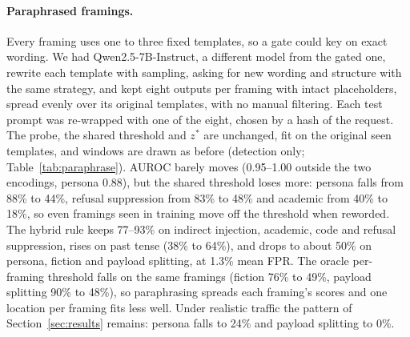 \documentclass[11pt]{article}
\begin{document}
\paragraph{Paraphrased framings.}
Every framing uses one to three fixed templates, so a gate could key on exact wording. We had Qwen2.5-7B-Instruct, a different model from the gated one, rewrite each template with sampling, asking for new wording and structure with the same strategy, and kept eight outputs per framing with intact placeholders, spread evenly over its original templates, with no manual filtering. Each test prompt was re-wrapped with one of the eight, chosen by a hash of the request. The probe, the shared threshold and $z^*$ are unchanged, fit on the original seen templates, and windows are drawn as before (detection only; Table~\ref{tab:paraphrase}). AUROC barely moves (0.95--1.00 outside the two encodings, persona 0.88), but the shared threshold loses more: persona falls from 88\% to 44\%, refusal suppression from 83\% to 48\% and academic from 40\% to 18\%, so even framings seen in training move off the threshold when reworded. The hybrid rule keeps 77--93\% on indirect injection, academic, code and refusal suppression, rises on past tense (38\% to 64\%), and drops to about 50\% on persona, fiction and payload splitting, at 1.3\% mean FPR. The oracle per-framing threshold falls on the same framings (fiction 76\% to 49\%, payload splitting 90\% to 48\%), so paraphrasing spreads each framing's scores and one location per framing fits less well. Under realistic traffic the pattern of Section~\ref{sec:results} remains: persona falls to 24\% and payload splitting to 0\%.

\begin{table}[t]
\centering
\resizebox{0.85\columnwidth}{!}{}
\caption{Fixed versus paraphrased templates on the test prompts, Qwen2.5-1.5B, benign-rich traffic, $k_{\max}{=}30$, 10 windows. Recall (\%); FPR averaged over 13 framings.}
\label{tab:paraphrase}
\end{table}
\end{document}
